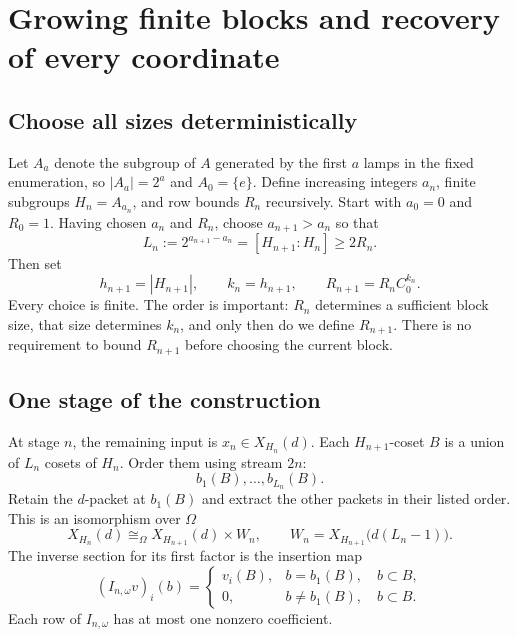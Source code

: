 \documentclass[11pt,a4paper]{article}
\numberwithin{equation}{section}
\newcommand{\reliso}{\mathrel{\cong_{\Omega}}}
\begin{document}
\section{Growing finite blocks and recovery of every coordinate}\label{sec:exhaustion}

\subsection{Choose all sizes deterministically}

Let $A_a$ denote the subgroup of $A$ generated by the first $a$ lamps
in the fixed enumeration, so $|A_a|=2^a$ and $A_0=\{e\}$. Define increasing integers
$a_n$, finite subgroups $H_n=A_{a_n}$, and row bounds $R_n$ recursively.
Start with $a_0=0$ and $R_0=1$. Having chosen $a_n$ and $R_n$, choose
$a_{n+1}>a_n$ so that
\begin{equation}\label{eq:choose-sizes}
 L_n:=2^{a_{n+1}-a_n}=[H_{n+1}:H_n]\geq2R_n.
\end{equation}
Then set
\begin{equation}\label{eq:recursion}
 h_{n+1}=|H_{n+1}|,
 \qquad k_n=h_{n+1},
 \qquad R_{n+1}=R_n C_0^{k_n}.
\end{equation}
Every choice is finite. The order is important: $R_n$ determines a
sufficient block size, that size determines $k_n$, and only then do we
define $R_{n+1}$. There is no requirement to bound $R_{n+1}$ before
choosing the current block.

\subsection{One stage of the construction}

At stage $n$, the remaining input is $x_n\in X_{H_n}(d)$. Each
$H_{n+1}$-coset $B$ is a union of $L_n$ cosets of $H_n$. Order them
using stream $2n$:
\[
 b_1(B),\ldots,b_{L_n}(B).
\]
Retain the $d$-packet at $b_1(B)$ and extract the other packets in their
listed order. This is an isomorphism over $\Omega$
\begin{equation}\label{eq:regroup}
 X_{H_n}(d)\reliso X_{H_{n+1}}(d)\times W_n,
 \qquad W_n=X_{H_{n+1}}\bigl(d(L_n-1)\bigr).
\end{equation}
The inverse section for its first factor is the insertion map
\begin{equation}\label{eq:insertion}
 (I_{n,\omega}v)_i(b)=
 \begin{cases}
 v_i(B),& b=b_1(B),\quad b\subset B,\\
 0,& b\ne b_1(B),\quad b\subset B.
 \end{cases}
\end{equation}
Each row of $I_{n,\omega}$ has at most one nonzero coefficient.
\end{document}
